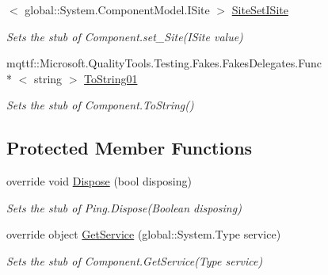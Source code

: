 \begin{DoxyCompactItemize}
$<$ global\-::\-System.\-Component\-Model.\-I\-Site $>$ \hyperlink{class_system_1_1_net_1_1_network_information_1_1_fakes_1_1_stub_ping_a56adb19964b0e6f268cce68f79d5ba44}{Site\-Set\-I\-Site}
\begin{DoxyCompactList}\small\item\em Sets the stub of Component.\-set\-\_\-\-Site(\-I\-Site value)\end{DoxyCompactList}\item 
mqttf\-::\-Microsoft.\-Quality\-Tools.\-Testing.\-Fakes.\-Fakes\-Delegates.\-Func\\*
$<$ string $>$ \hyperlink{class_system_1_1_net_1_1_network_information_1_1_fakes_1_1_stub_ping_a1af487e190727bff6f199be2871d4561}{To\-String01}
\begin{DoxyCompactList}\small\item\em Sets the stub of Component.\-To\-String()\end{DoxyCompactList}\end{DoxyCompactItemize}
\subsection*{Protected Member Functions}
\begin{DoxyCompactItemize}
\item 
override void \hyperlink{class_system_1_1_net_1_1_network_information_1_1_fakes_1_1_stub_ping_a9813b6c4c8b2d3c48899c9aa8e51fda4}{Dispose} (bool disposing)
\begin{DoxyCompactList}\small\item\em Sets the stub of Ping.\-Dispose(\-Boolean disposing)\end{DoxyCompactList}\item 
override object \hyperlink{class_system_1_1_net_1_1_network_information_1_1_fakes_1_1_stub_ping_a1cda46adef79213c3a81f62768a5d784}{Get\-Service} (global\-::\-System.\-Type service)
\begin{DoxyCompactList}\small\item\em Sets the stub of Component.\-Get\-Service(\-Type service)\end{DoxyCompactList}\end{DoxyCompactItemize}
